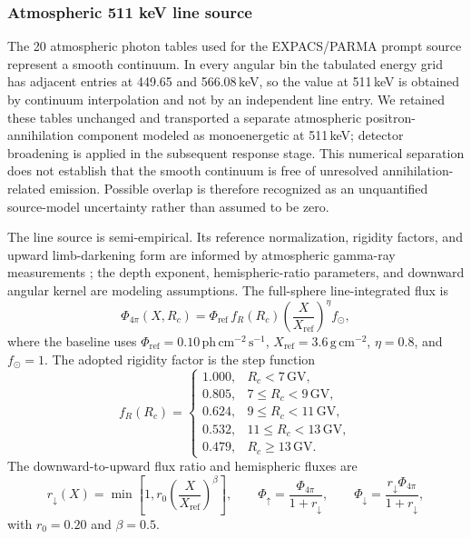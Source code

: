 \documentclass[11pt]{article}
\begin{document}
\subsubsection{Atmospheric 511 keV line source}
\label{subsec:atm511_source}

The 20 atmospheric photon tables used for the EXPACS/PARMA prompt source represent
a smooth continuum. In every angular bin the tabulated energy grid has adjacent
entries at 449.65 and 566.08\,keV, so the value at 511\,keV is obtained by
continuum interpolation and not by an independent line entry. We retained these
tables unchanged and transported a separate atmospheric positron-annihilation
component modeled as monoenergetic at 511\,keV; detector broadening is applied in
the subsequent response stage. This numerical
separation does not establish that the smooth continuum is free of unresolved
annihilation-related emission. Possible overlap is therefore recognized as an
unquantified source-model uncertainty rather than assumed to be zero.

The line source is semi-empirical. Its reference normalization, rigidity factors,
and upward limb-darkening form are informed by atmospheric gamma-ray measurements
\cite{Mahoney1981Atmospheric,Harris2003Atmospheric}; the depth exponent,
hemispheric-ratio parameters, and downward angular kernel are modeling assumptions.
The full-sphere line-integrated flux is
\begin{equation}
  \Phi_{4\pi}(X,R_c)=\Phi_{\mathrm{ref}}\,f_R(R_c)
  \left(\frac{X}{X_{\mathrm{ref}}}\right)^{\eta} f_{\odot},
  \label{eq:atm511_flux}
\end{equation}
where the baseline uses $\Phi_{\mathrm{ref}}=0.10\,
\mathrm{ph\,cm^{-2}\,s^{-1}}$, $X_{\mathrm{ref}}=3.6\,
\mathrm{g\,cm^{-2}}$, $\eta=0.8$, and $f_{\odot}=1$. The adopted rigidity
factor is the step function
\begin{equation}
 f_R(R_c)=
 \begin{cases}
  1.000, & R_c<7\,\mathrm{GV},\\
  0.805, & 7\le R_c<9\,\mathrm{GV},\\
  0.624, & 9\le R_c<11\,\mathrm{GV},\\
  0.532, & 11\le R_c<13\,\mathrm{GV},\\
  0.479, & R_c\ge13\,\mathrm{GV}.
 \end{cases}
 \label{eq:atm511_rigidity}
\end{equation}
The downward-to-upward flux ratio and hemispheric fluxes are
\begin{equation}
  r_{\downarrow}(X)=\min\!\left[1,r_0
  \left(\frac{X}{X_{\mathrm{ref}}}\right)^{\beta}\right],\qquad
  \Phi_{\uparrow}=\frac{\Phi_{4\pi}}{1+r_{\downarrow}},\qquad
  \Phi_{\downarrow}=\frac{r_{\downarrow}\Phi_{4\pi}}{1+r_{\downarrow}},
  \label{eq:atm511_split}
\end{equation}
with $r_0=0.20$ and $\beta=0.5$.
\end{document}
